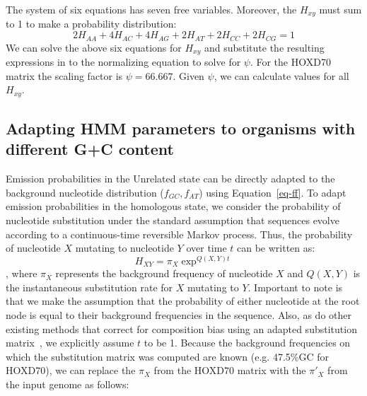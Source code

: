 The system of six equations has seven free variables.  Moreover, the $H_{xy}$ must sum to 1 to make a probability distribution:
\begin{equation}
2H_{AA} + 4H_{AC} + 4H_{AG} + 2H_{AT} + 2H_{CC} + 2H_{CG} = 1
\end{equation}
We can solve the above six equations for $H_{xy}$ and substitute the
resulting expressions in to the normalizing equation to solve for
$\psi$. For the HOXD70 matrix the scaling factor is $\psi=66.667$. Given
$\psi$, we can calculate values for all $H_{xy}$.

\subsection*{Adapting HMM parameters to organisms with different G+C content}

Emission
probabilities in the Unrelated state can be directly adapted to the
background nucleotide distribution ($f_{GC}, f_{AT}$) using Equation~\ref{eq-ff}. To adapt emission probabilities in the homologous state, we consider the
probability of nucleotide substitution under the standard assumption
that sequences evolve according to a continuous-time reversible Markov process.
Thus, the probability of nucleotide $X$ mutating to nucleotide $Y$ over time $t$
can be written as:
\begin{equation}
H_{XY}=\pi_X \exp^{Q(X,Y)t}
\end{equation}
, where $\pi_X$ represents the background
frequency of nucleotide $X$ and $Q(X,Y)$ is the instantaneous substitution rate for $X$
mutating to $Y$. Important to note is that we make the assumption that the probability of
either nucleotide at the root node is equal to their background
frequencies in the sequence. Also, as do other existing methods that correct for composition bias using an adapted substitution matrix~\cite{repseek}, we explicitly assume $t$ to be 1.  Because the background frequencies on which the substitution matrix was computed are
known (e.g. 47.5\%GC for HOXD70), we can replace the $\pi_X$ from the HOXD70 matrix
with the $\pi'_X$ from the input genome as follows:

